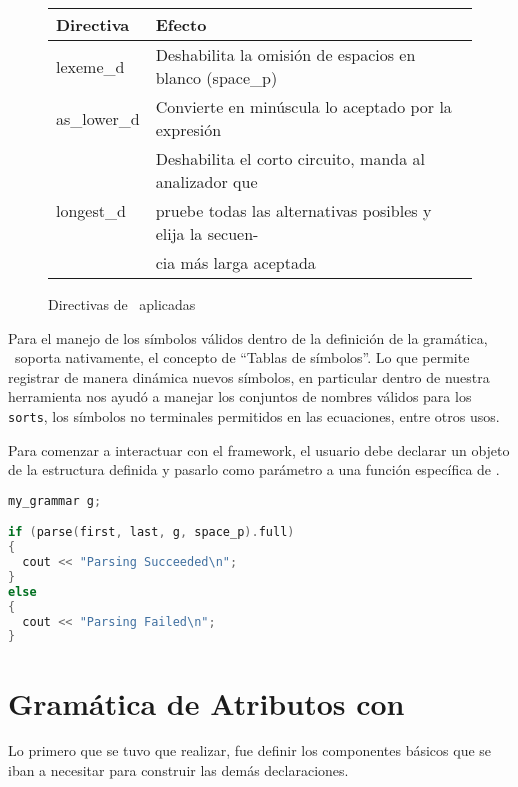 \begin{figure}[h!]\centering\scriptsize
\begin{tabular}{| l | p{7cm} |}
\hline

\rowcolor{gris} \textbf{Directiva} & \textbf{Efecto} \\ \hline

lexeme\_d    & Deshabilita la omisión de espacios en blanco (space\_p)\\ \hline
as\_lower\_d & Convierte en minúscula lo aceptado por la expresión\\ \hline
\multirow{3}{*}{longest\_d} & Deshabilita el corto circuito, manda al analizador que\\
                            & pruebe todas las alternativas posibles y elija la secuen-\\
                            & cia más larga aceptada \\ \hline
\end{tabular}
\caption{\label{directivas} Directivas de \spirit\ aplicadas}
\end{figure}

Para el manejo de los símbolos válidos dentro de la definición de la gramática, \spirit\ soporta nativamente, el concepto de ``Tablas de símbolos''. Lo que permite registrar de manera dinámica nuevos símbolos, en particular dentro de nuestra herramienta nos ayudó a manejar los conjuntos de nombres válidos para los \texttt{sorts}, los símbolos no terminales permitidos en las ecuaciones, entre otros usos.

Para comenzar a interactuar con el framework, el usuario debe declarar un objeto de la estructura definida y pasarlo como parámetro a una función específica de \spirit.

\begin{lstlisting}[float=t!, language=C++, basicstyle=\scriptsize, columns=fullflexible, linewidth=6cm]
my_grammar g;

if (parse(first, last, g, space_p).full)
{
  cout << "Parsing Succeeded\n";
}
else
{
  cout << "Parsing Failed\n";
}
\end{lstlisting}


\section{Gramática de Atributos con \spirit}

Lo primero que se tuvo que realizar, fue definir los componentes básicos que se iban a necesitar para construir las demás declaraciones.

